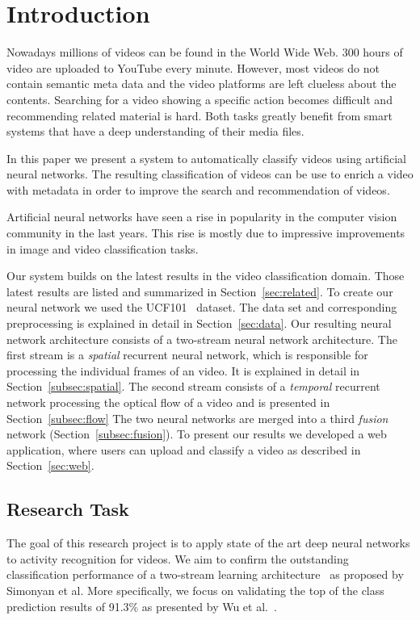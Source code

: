 \section{Introduction}
\label{sec:introduction}

Nowadays millions of videos can be found in the World Wide Web.
300 hours of video are uploaded to YouTube every minute.
However, most videos do not contain semantic meta data and the video platforms are left clueless about the contents.
Searching for a video showing a specific action becomes difficult and recommending related material is hard. Both tasks greatly benefit from smart systems that have a deep understanding of their media files. 

In this paper we present a system to automatically classify videos using artificial neural networks.
The resulting classification of videos can be use to enrich a video with metadata in order to improve the search and recommendation of videos.

Artificial neural networks have seen a rise in popularity in the computer vision community in the last years.
This rise is mostly due to impressive improvements in image and video classification tasks.

Our system builds on the latest results in the video classification domain.
Those latest results are listed and summarized in Section~\ref{sec:related}.
To create our neural network we used the UCF101~\cite{soomro2012ucf101} dataset.
The data set and corresponding preprocessing is explained in detail in Section~\ref{sec:data}.
Our resulting neural network architecture consists of a two-stream neural network architecture.
The first stream is a \emph{spatial} recurrent  neural network, which is responsible for processing the individual frames of an video.
It is explained in detail in Section~\ref{subsec:spatial}.
The second stream consists of a \emph{temporal} recurrent  network processing the optical flow of a video and is presented in Section~\ref{subsec:flow}
The two neural networks are merged into a third \emph{fusion} network (Section~\ref{subsec:fusion}).
To present our results we developed a web application, where users can upload and classify a video as described in Section~\ref{sec:web}.

\subsection*{Research Task}
The goal of this research project is to apply state of the art deep neural networks to activity recognition for videos.
We aim to confirm the outstanding classification performance of a two-stream learning architecture~\cite{simonyan2014two} as proposed by Simonyan et al.
More specifically, we focus on validating the top of the class prediction results of 91.3\% as presented by Wu et al.~\cite{wu2015modeling}.